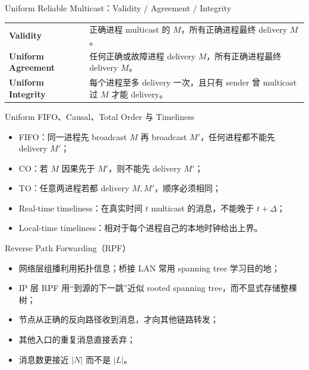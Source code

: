 \documentclass[UTF8,fontset=none,aspectratio=169,10pt]{beamer}
\begin{document}
{\begin{frame}{Uniform Reliable Multicast：Validity / Agreement / Integrity}
\begin{tabularx}{\linewidth}{>{\bfseries}p{2.6cm}X}
\toprule
Validity & 正确进程 multicast 的 $M$，所有正确进程最终 delivery $M$。 \\
Uniform Agreement & 任何正确或故障进程 delivery $M$，所有正确进程最终 delivery $M$。 \\
Uniform Integrity & 每个进程至多 delivery 一次，且只有 sender 曾 multicast 过 $M$ 才能 delivery。 \\
\bottomrule
\end{tabularx}
\vfill
{}
\end{frame}

\begin{frame}{Uniform FIFO、Causal、Total Order 与 Timeliness}
\begin{itemize}
  \item FIFO：同一进程先 broadcast $M$ 再 broadcast $M'$，任何进程都不能先 delivery $M'$；
  \item CO：若 $M$ 因果先于 $M'$，则不能先 delivery $M'$；
  \item TO：任意两进程若都 delivery $M,M'$，顺序必须相同；
  \item Real-time timeliness：在真实时间 $t$ multicast 的消息，不能晚于 $t+\Delta$；
  \item Local-time timeliness：相对于每个进程自己的本地时钟给出上界。
\end{itemize}
\end{frame}


\begin{frame}{Reverse Path Forwarding（RPF）}
\begin{itemize}
  \item 网络层组播利用拓扑信息；桥接 LAN 常用 spanning tree 学习目的地；
  \item IP 层 RPF 用“到源的下一跳”近似 rooted spanning tree，而不显式存储整棵树；
  \item 节点从正确的反向路径收到消息，才向其他链路转发；
  \item 其他入口的重复消息直接丢弃；
  \item 消息数更接近 $|N|$ 而不是 $|L|$。
\end{itemize}
\end{frame}

}
\end{document}
